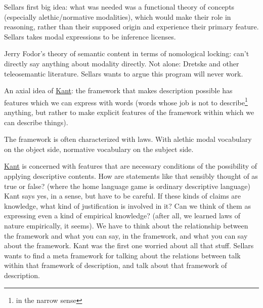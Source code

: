 Sellars first big idea: what was needed was a functional theory of concepts (especially alethic/normative modalities), which would make their role in reasoning, rather than their supposed origin and experience their primary feature. Sellars takes modal expressions to be inference licenses.


Jerry Fodor's theory of semantic content in terms of nomological locking: can't directly say anything about modality directly. Not alone: Dretske and other teleosemantic literature. Sellars wants to argue this program will never work.

An axial idea of \href{doc/phil/People/Kant|An axial idea of Kant}{Kant}: the framework that makes description possible has features which we can express with words (words whose job is not to describe\footnote{in the narrow sense} anything, but rather to make explicit features of the framework within which we can describe things).

The framework is often characterized with laws. With alethic modal vocabulary on the object side, normative vocabulary on the subject side.

\href{doc/phil/People/Kant|What Kant is concerned with}{Kant} is concerned with features that are necessary conditions of the possibility of applying descriptive contents. How are statements like that sensibly thought of as true or false? (where the home language game is ordinary descriptive language) Kant says yes, in a sense, but have to be careful. If these kinds of claims are knowledge, what kind of justification is involved in it? Can we think of them as expressing even a kind of empirical knowledge? (after all, we learned laws of nature empirically, it seems). We have to think about the relationship between the framework and what you can say, in the framework, and what you can say about the framework. Kant was the first one worried about all that stuff. Sellars wants to find a meta framework for talking about the relations between talk within that framework of description, and talk about that framework of description.

